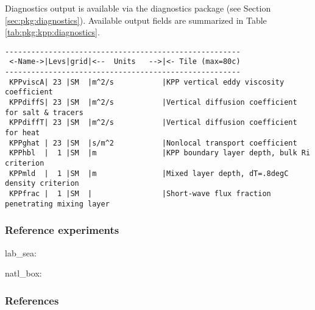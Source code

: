 Diagnostics output is available via the diagnostics package
(see Section \ref{sec:pkg:diagnostics}).
Available output fields are summarized in 
Table \ref{tab:pkg:kpp:diagnostics}.

\begin{table}[h!]
\centering
\label{tab:pkg:kpp:diagnostics}
{\footnotesize
\begin{verbatim}
------------------------------------------------------
 <-Name->|Levs|grid|<--  Units   -->|<- Tile (max=80c)
------------------------------------------------------
 KPPviscA| 23 |SM  |m^2/s           |KPP vertical eddy viscosity coefficient
 KPPdiffS| 23 |SM  |m^2/s           |Vertical diffusion coefficient for salt & tracers
 KPPdiffT| 23 |SM  |m^2/s           |Vertical diffusion coefficient for heat
 KPPghat | 23 |SM  |s/m^2           |Nonlocal transport coefficient
 KPPhbl  |  1 |SM  |m               |KPP boundary layer depth, bulk Ri criterion
 KPPmld  |  1 |SM  |m               |Mixed layer depth, dT=.8degC density criterion
 KPPfrac |  1 |SM  |                |Short-wave flux fraction penetrating mixing layer
\end{verbatim}
}
\caption{~}
\end{table}


\subsubsection{Reference experiments}

lab\_sea:

natl\_box:


\subsubsection{References}

